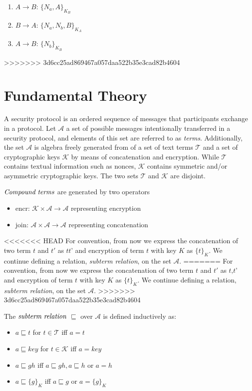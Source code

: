 \begin{enumerate}
\item $A \rightarrow B$: $\{N_a, A\}_{K_B}$
\item $B \rightarrow A$: $\{N_a,N_b, B\}_{K_A}$
\item $A \rightarrow B$: $\{N_b\}_{K_B}$
\end{enumerate}
>>>>>>> 3d6cc25ad869467a057daa522b35e3cad82b4604

\section{Fundamental Theory}

A security protocol is an ordered sequence of messages that participants exchange in a protocol. Let $\mathcal{A}$ a set of possible messages intentionally transferred in a security protocol, and elements of this set are referred to as \textit{terms}. Additionally, the set $\mathcal{A}$ is algebra freely generated from of a set of text terms $\mathcal{T}$ and a set of cryptographic keys $\mathcal{K}$ by means of concatenation and encryption. While $\mathcal{T}$ contains textual information such as nonces, $\mathcal{K}$ contains symmetric and/or asymmetric cryptographic keys. The two sets $\mathcal{T}$ and $\mathcal{K}$ are disjoint. 

\begin{Definition} $\emph{Compound terms}$ are generated by two operators
\begin{itemize}
	\item encr: $\mathcal{K} \times \mathcal{A} \rightarrow \mathcal{A}$ representing encryption
	\item join: $\mathcal{A} \times \mathcal{A} \rightarrow \mathcal{A}$ representing concatenation
\end{itemize}
\end{Definition}

<<<<<<< HEAD
For convention, from now we express the concatenation of two term $t$ and $t'$ as $\textit{tt'}$ and encryption of term $t$ with key $K$ as $\{t\}_K$. We continue defining a relation, \textit{subterm relation}, on the set $\mathcal{A}$. 
=======
For convention, from now we express the concatenation of two term $t$ and $t'$ as $\textit{t,t'}$ and encryption of term $t$ with key $K$ as $\{t\}_K$. We continue defining a relation, \textit{subterm relation}, on the set $\mathcal{A}$. 
>>>>>>> 3d6cc25ad869467a057daa522b35e3cad82b4604

\begin{Definition} The $\emph{subterm relation}$ $\sqsubseteq$ over $\mathcal{A}$ is defined inductively as: 
	\begin{itemize}
		\item $a \sqsubseteq t $ for $t \in \mathcal{T}$   iff $a = t $
		\item $a \sqsubseteq key $ for $t \in \mathcal{K}$   iff $a = key $
		\item $a \sqsubseteq gh $ iff $a \sqsubseteq gh, a \sqsubseteq h $ or $ a= h $
		\item $a \sqsubseteq \{g\}_K $ iff $a \sqsubseteq g $ or $a = \{g\}_K$
	\end{itemize} 
\end{Definition}

